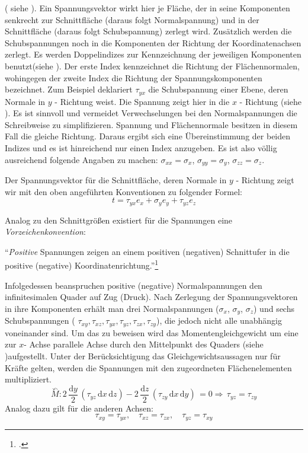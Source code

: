 \documentclass[12pt,a4paper,parskip]{scrartcl}
\begin{document}
{  ( siehe ). Ein Spannungsvektor wirkt hier je Fläche, der in seine Komponenten senkrecht zur Schnittfläche (daraus folgt Normalspannung) und in der Schnittfläche (daraus folgt Schubspannung) zerlegt wird. Zusätzlich werden die Schubspannungen noch in die Komponenten der Richtung der Koordinatenachsen zerlegt. Es werden Doppelindizes zur Kennzeichnung der jeweiligen Komponenten benutzt(siehe ). 
Der erste Index kennzeichnet die Richtung der Flächennormalen, wohingegen der zweite Index die Richtung der Spannungskomponenten bezeichnet. Zum Beispiel deklariert $ \tau_{yx} $ die Schubspannung einer Ebene, deren Normale in $y$ - Richtung weist. Die Spannung zeigt hier in die $ x $ - Richtung (siehe ). Es ist sinnvoll und vermeidet Verwechselungen bei den Normalspannungen die Schreibweise zu simplifizieren. Spannung und Flächennormale besitzen in diesem Fall die gleiche Richtung. Daraus ergibt sich eine Übereinstimmung der beiden Indizes und es ist hinreichend nur einen Index anzugeben. Es ist also völlig ausreichend  folgende Angaben zu machen: $ \sigma_{xx} = \sigma_{x} $, $ \sigma_{yy} = \sigma_y $, $ \sigma_{zz} = \sigma_z $.

Der Spannungsvektor für die Schnittfläche, deren Normale in $ y $ - Richtung zeigt wir mit den oben angeführten Konventionen zu folgender Formel:
\begin{equation}
t = \tau_{yx}e_x + \sigma_ye_y + \tau_{yz}e_z
\end{equation}

Analog zu den Schnittgrößen existiert für die Spannungen eine \emph{Vorzeichenkonvention}:

"`\emph{Positive} Spannungen zeigen an einem positiven (negativen) Schnittufer in die positive (negative) Koordinatenrichtung."'\footcite[Vgl.][45]{tmr}

Infolgedessen beanspruchen positive (negative) Normalspannungen den infinitesimalen Quader auf Zug (Druck). Nach Zerlegung der Spannungsvektoren in ihre Komponenten erhält man drei Normalspannungen ($ \sigma_x$, $ \sigma_y $, $ \sigma_z $) und sechs Schubspannungen ( $ \tau_{xy}, \tau_{xz}, \tau_{yx}, \tau_{yz}, \tau_{zx}, \tau_{zy} $), die jedoch nicht alle unabhängig voneinander sind. Um das zu beweisen wird das Momentengleichgewicht um eine zur $x$- Achse parallele Achse durch den Mittelpunkt des Quaders (siehe )aufgestellt. Unter der Berücksichtigung das Gleichgewichtsaussagen nur für Kräfte gelten, werden die Spannungen mit den zugeordneten Flächenelementen multipliziert.
\begin{equation}
\overset{\curvearrowleft}{M}: 2\,\frac{\text{d}y}{2}\,(\tau_{yz}\,\text{d}x\,\text{d}z) - 2\,\frac{\text{d}z}{2}\,(\tau_{zy}\, \text{d}x\,\text{d}y)\,= 0 \Rightarrow\,\tau_{yz} = \tau_{zy}
\end{equation} Analog dazu gilt für die anderen Achsen: \begin{equation}
\tau_{xy}=\tau_{yx},\quad\tau_{xz}=\tau_{zx},\quad\tau_{yz}=\tau_{xy}
\end{equation}

}
\end{document}
